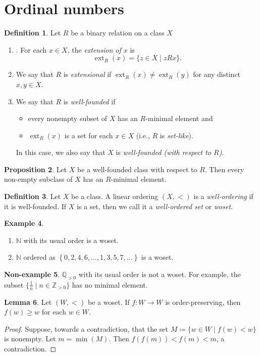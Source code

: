 \documentclass[10pt,letterpaper,cm]{nupset}
\theoremstyle{definition}
\newtheorem{definition}{Definition}[subsection]
\newtheorem{exmp}[definition]{Example}
\newtheorem{non-exmp}[definition]{Non-example}
\theoremstyle{theorem}
\newtheorem{lemma}[definition]{Lemma}
\newtheorem{prop}[definition]{Proposition}
\theoremstyle{remark}
\newcommand{\N}{\mathbb N}
\newcommand{\Q}{\mathbb Q}
\newcommand{\Z}{\mathbb Z}
\newcommand{\1}{\mathbf{1}}
\newcommand{\0}{\vec 0}
\DeclareMathOperator{\ext}{ext}
\newcommand{\bi}{\begin{itemize}}
\newcommand{\ei}{\end{itemize}}
\newcommand{\be}{\begin{enumerate}}
\newcommand{\ee}{\end{enumerate}}
\begin{document}
\section{Ordinal numbers}

\begin{definition}  Let $R$ be a binary relation on a class $X$
\be
\item. For each $x\in X$, the \textit{extension of $x$} is $$\ext_R(x) = \{z\in X \mid zRx\}    .$$
\item We say that $R$ is \textit{extensional} if $\ext_R(x) \ne \ext_R(y)$ for any distinct $x,y \in X$.
\item We say that $R$ is \textit{well-founded} if 
 \bi
 \item every nonempty subset of $X$ has an $R$-minimal element and
 \item $\ext_R(x)$ is a set for each $x\in X$ (i.e., $R$ is \textit{set-like}).
 \ei
 In this case, we also say that $X$ is \textit{well-founded (with respect to $R$)}. 
\ee
 \end{definition}

\begin{prop}
Let $X$ be a well-founded class with respect to $R$. Then every non-empty subclass of $X$ has an $R$-minimal element.
\end{prop}

\begin{definition}
Let $X$ be a class. A linear ordering $(X, <)$ is a \textit{well-ordering} if it is well-founded. If $X$ is a set, then we call it a \textit{well-ordered set} or \textit{woset}.
\end{definition}

\begin{exmp} $ $
\begin{enumerate}
\item $\N$ with its usual order is a woset. 
\item $\N$ ordered as $\left\{0, 2, 4, 6, \ldots, 1, 3, 5, 7, \ldots\right\}$ is a woset.
\end{enumerate}
\end{exmp}

\begin{non-exmp}
$\Q_{>0}$ with its usual order is not a woset. For example, the subset $\{\frac{1}{n} \mid n \in \Z_{>0}\}$ has no minimal element. 
\end{non-exmp}

\begin{lemma}\label{woprop}
Let $(W, <)$ be a woset. If $f: W \to W$ is order-preserving, then $f(w) \geq w$ for each $w\in W$.
\end{lemma}
\begin{proof}
Suppose, towards a contradiction, that the set $M \coloneqq \{w\in W \mid f(w) <w\}$ is nonempty. Let $m = \min(M)$. Then $f(f(m))< f(m) < m$, a contradiction. 
\end{proof}
\end{document}
